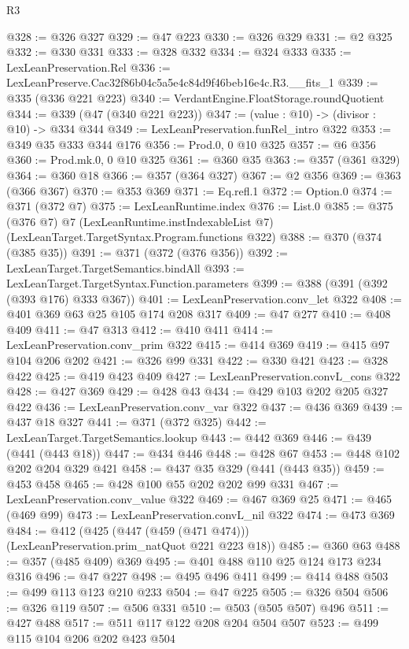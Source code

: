 \begin{lexlean}{R3}
\begin{coremodule}
@328 := @326 @327
@329 := @47 @223
@330 := @326 @329
@331 := @2 @325
@332 := @330 @331
@333 := @328 @332
@334 := @324 @333
@335 := LexLeanPreservation.Rel
@336 := LexLeanPreserve.Cac32f86b04c5a5e4c84d9f46beb16e4c.R3.__fits_1
@339 := @335 (@336 @221 @223)
@340 := VerdantEngine.FloatStorage.roundQuotient
@344 := @339 (@47 (@340 @221 @223))
@347 := (value : @10) -> (divisor : @10) -> @334 @344
@349 := LexLeanPreservation.funRel_intro @322
@353 := @349 @35 @333 @344 @176
@356 := Prod.{0, 0} @10 @325
@357 := @6 @356
@360 := Prod.mk.{0, 0} @10 @325
@361 := @360 @35
@363 := @357 (@361 @329)
@364 := @360 @18
@366 := @357 (@364 @327)
@367 := @2 @356
@369 := @363 (@366 @367)
@370 := @353 @369
@371 := Eq.refl.{1}
@372 := Option.{0}
@374 := @371 (@372 @7)
@375 := LexLeanRuntime.index
@376 := List.{0}
@385 := @375
    (@376 @7)
    @7
    (LexLeanRuntime.instIndexableList @7)
    (LexLeanTarget.TargetSyntax.Program.functions @322)
@388 := @370 (@374 (@385 @35))
@391 := @371 (@372 (@376 @356))
@392 := LexLeanTarget.TargetSemantics.bindAll
@393 := LexLeanTarget.TargetSyntax.Function.parameters
@399 := @388 (@391 (@392 (@393 @176) @333 @367))
@401 := LexLeanPreservation.conv_let @322
@408 := @401 @369 @63 @25 @105 @174 @208 @317
@409 := @47 @277
@410 := @408 @409
@411 := @47 @313
@412 := @410 @411
@414 := LexLeanPreservation.conv_prim @322
@415 := @414 @369
@419 := @415 @97 @104 @206 @202
@421 := @326 @99 @331
@422 := @330 @421
@423 := @328 @422
@425 := @419 @423 @409
@427 := LexLeanPreservation.convL_cons @322
@428 := @427 @369
@429 := @428 @43
@434 := @429 @103 @202 @205 @327 @422
@436 := LexLeanPreservation.conv_var @322
@437 := @436 @369
@439 := @437 @18 @327
@441 := @371 (@372 @325)
@442 := LexLeanTarget.TargetSemantics.lookup
@443 := @442 @369
@446 := @439 (@441 (@443 @18))
@447 := @434 @446
@448 := @428 @67
@453 := @448 @102 @202 @204 @329 @421
@458 := @437 @35 @329 (@441 (@443 @35))
@459 := @453 @458
@465 := @428 @100 @55 @202 @202 @99 @331
@467 := LexLeanPreservation.conv_value @322
@469 := @467 @369 @25
@471 := @465 (@469 @99)
@473 := LexLeanPreservation.convL_nil @322
@474 := @473 @369
@484 := @412 (@425 (@447 (@459 (@471 @474))) (LexLeanPreservation.prim_natQuot @221 @223 @18))
@485 := @360 @63
@488 := @357 (@485 @409) @369
@495 := @401 @488 @110 @25 @124 @173 @234 @316
@496 := @47 @227
@498 := @495 @496 @411
@499 := @414 @488
@503 := @499 @113 @123 @210 @233
@504 := @47 @225
@505 := @326 @504
@506 := @326 @119
@507 := @506 @331
@510 := @503 (@505 @507) @496
@511 := @427 @488
@517 := @511 @117 @122 @208 @204 @504 @507
@523 := @499 @115 @104 @206 @202 @423 @504

\end{coremodule}
\end{lexlean}
